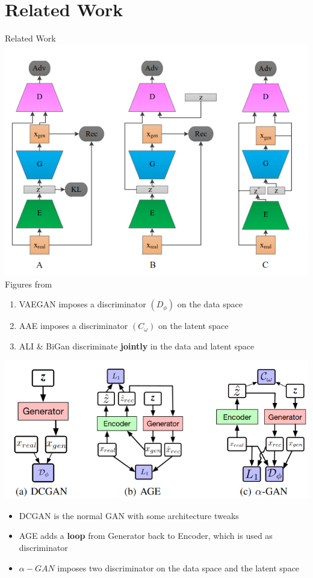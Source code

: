 \documentclass[compress]{beamer}
\begin{document}
\section{Related Work}
\begin{frame}[allowframebreaks]{Related Work}
    \includegraphics[scale=0.45]{relatedwork}
    {\tiny{Figures from \cite{huang2018introvae}}}
    \begin{enumerate}[A]
        \item VAEGAN imposes a discriminator $(D_\phi)$ on the data space
        \item AAE imposes a discriminator $(C_\omega)$ on the latent space
        \item ALI \& BiGan discriminate \textbf{jointly} in the data and latent space
    \end{enumerate}
    \framebreak
    \includegraphics[scale=0.5]{relatedwork2}
    \begin{itemize}
        \item DCGAN is the normal GAN with some architecture tweaks
        \item AGE adds a \textbf{loop} from Generator back to Encoder, which is used as discriminator
        \item $\alpha-GAN$ imposes two discriminator on the data space and the latent space
    \end{itemize}
\end{frame}
\end{document}
